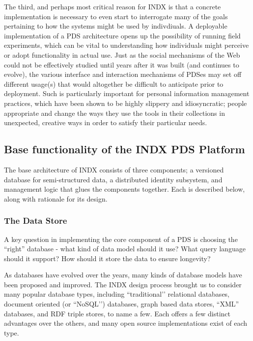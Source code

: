 \documentclass[graybox]{svmult}
\begin{document}
The third, and perhaps most critical reason for INDX is that a concrete implementation is necessary to even start to interrogate many of the goals pertaining to how the systems might be used by indivdiuals.  A deployable implementation of a PDS architecture opens up the possibility of running field experiments, which can be vital to understanding how individuals might perceive or adopt functionality in actual use.  Just as the social mechanisms of the Web could not be effectively studied until years after it was built (and continues to evolve), the various interface and interaction mechanisms of PDSes may set off different usage(s) that would altogether be difficult to anticipate prior to deployment.   Such is particularly important for personal information management practices, which have been shown to be highly slippery and idiosyncratic; people appropriate and change the ways they use the tools in their collections in unexpected, creative ways in order to satisfy their particular needs.

\subsection{Base functionality of the INDX PDS Platform}

The base architecture of INDX consists of three components; a versioned database for semi-structured data, a distributed identity subsystem, and management logic that glues the components together.   Each is described below, along with rationale for its design.

\subsubsection{The Data Store}
A key question in implementing the core component of a PDS is choosing the “right” database - what kind of data model should it use? What query language should it support? How should it store the data to ensure longevity? 

As databases have evolved over the years, many kinds of database models have been proposed and improved.  The INDX design process brought us to consider many popular database types, including ``traditional’’ relational databases, document oriented (or ``NoSQL’’) databases, graph based data stores, “XML” databases, and RDF triple stores, to name a few.  Each offers a few distinct advantages over the others, and many open source implementations exist of each type.
\end{document}
